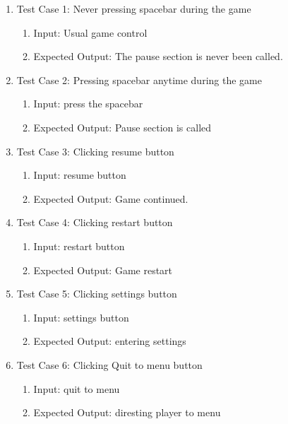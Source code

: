 \documentclass[11pt]{article}
\begin{document}
    \begin{enumerate}
        \item Test Case 1: Never pressing spacebar during the game
        \begin{enumerate}
            \item Input: Usual game control
            \item Expected Output: The pause section is never been called.
        \end{enumerate}
        
        \item Test Case 2: Pressing spacebar anytime during the game
        \begin{enumerate}
            \item Input: press the spacebar
            \item Expected Output: Pause section is called
        \end{enumerate}
        
        \item Test Case 3: Clicking resume button
        \begin{enumerate}
            \item Input: resume button
            \item Expected Output: Game continued.
        \end{enumerate}

        \item Test Case 4: Clicking restart button
        \begin{enumerate}
            \item Input: restart button
            \item Expected Output: Game restart
        \end{enumerate}
        
        \item Test Case 5: Clicking settings button
        \begin{enumerate}
            \item Input: settings button
            \item Expected Output: entering settings
        \end{enumerate}

        \item Test Case 6: Clicking Quit to menu button
        \begin{enumerate}
            \item Input: quit to menu
            \item Expected Output: diresting player to menu
        \end{enumerate}

        
    \end{enumerate}
\end{document}
